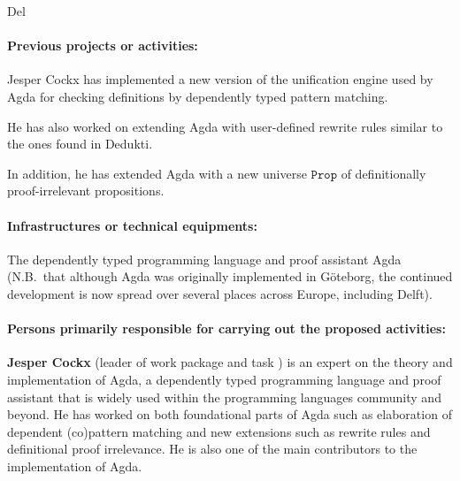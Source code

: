 \begin{sitedescription}{Del}

\paragraph*{Previous projects or activities:}

\begin{compactitem}
  \item Jesper Cockx has implemented a new version of the unification
  engine used by Agda for checking definitions by dependently typed
  pattern matching.
  \item He has also worked on extending Agda with user-defined
  rewrite rules similar to the ones found in Dedukti.
  \item In addition, he has extended Agda with a new universe
  $\texttt{Prop}$ of definitionally proof-irrelevant propositions.
\end{compactitem}

\paragraph*{Infrastructures or technical equipments:}

\begin{compactitem}
  \item The dependently typed programming language and proof assistant
  Agda (N.B.~that although Agda was originally implemented in
  G\"oteborg, the continued development is now spread over several
  places across Europe, including Delft).
\end{compactitem}

\paragraph*{Persons primarily responsible for carrying out the proposed activities:}

\begin{compactitem}

  \item{\bf Jesper Cockx} (leader of work package 
  and task ) is an expert on the theory and
  implementation of Agda, a dependently typed programming language and
  proof assistant that is widely used within the programming languages
  community and beyond. He has worked on both foundational parts of
  Agda such as elaboration of dependent (co)pattern matching and new
  extensions such as rewrite rules and definitional proof
  irrelevance. He is also one of the main contributors to the
  implementation of Agda.


\end{compactitem}
\end{sitedescription}

